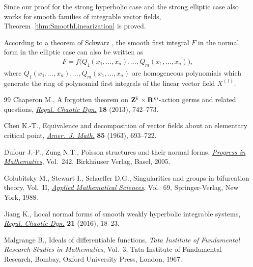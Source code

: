 \documentclass[11pt]{article}
\numberwithin{equation}{section}
\begin{document}
Since our proof for the strong hyperbolic case and the strong elliptic case also works for smooth families of integrable vector f\/ields,
Theorem~\ref{thm:SmoothLinearization} is proved.

\begin{Remark}
According to a theorem of Schwarz \cite{Schwarz-Invariant1975},
the smooth f\/irst integral $F$ in the normal form in the elliptic case can also be written as
\begin{gather*}
 F = f\big(Q_1(x_1,\dots,x_n), \dots, Q_m(x_1,\dots,x_n)\big),
\end{gather*}
where $Q_1(x_1,\dots,x_n), \dots, Q_m(x_1,\dots,x_n)$ are homogeneous polynomials which generate
the ring of polynomial f\/irst integrals of the linear vector f\/ield $X^{(1)}$.
\end{Remark}
\begin{thebibliography}{99}
Chaperon M., A forgotten theorem on {${\bf Z}^k\times{\bf R}^m$}-action germs
 and related questions, \href{https://doi.org/10.1134/S1560354713060130}{\textit{Regul. Chaotic Dyn.}} \textbf{18} (2013),
 742--773.

Chen K.-T., Equivalence and decomposition of vector f\/ields about an elementary
 critical point, \href{https://doi.org/10.2307/2373115}{\textit{Amer.~J. Math.}} \textbf{85} (1963), 693--722.

Dufour J.-P., Zung N.T., Poisson structures and their normal forms,
 \href{https://doi.org/10.1007/b137493}{\textit{Progress in Mathematics}}, Vol.~242, Birkh\"auser Verlag, Basel, 2005.

Golubitsky M., Stewart I., Schaef\/fer D.G., Singularities and groups in
 bifurcation theory, {V}ol.~{II}, \href{https://doi.org/10.1007/978-1-4612-4574-2}{\textit{Applied Mathematical Sciences}},
 Vol.~69, Springer-Verlag, New York, 1988.

Jiang K., Local normal forms of smooth weakly hyperbolic integrable systems,
 \href{https://doi.org/10.1134/S1560354716010020}{\textit{Regul. Chaotic Dyn.}} \textbf{21} (2016), 18--23.

Malgrange B., Ideals of dif\/ferentiable functions, \textit{Tata Institute of
 Fundamental Research Studies in Mathematics}, Vol.~3, Tata Institute of
 Fundamental Research, Bombay, Oxford University Press, London, 1967.


\end{thebibliography}
\end{document}
